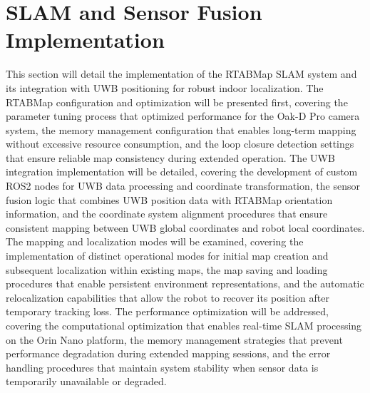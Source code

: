 \section{SLAM and Sensor Fusion Implementation}
This section will detail the implementation of the RTABMap SLAM system and its integration with UWB positioning for robust indoor localization. The RTABMap configuration and optimization will be presented first, covering the parameter tuning process that optimized performance for the Oak-D Pro camera system, the memory management configuration that enables long-term mapping without excessive resource consumption, and the loop closure detection settings that ensure reliable map consistency during extended operation. The UWB integration implementation will be detailed, covering the development of custom ROS2 nodes for UWB data processing and coordinate transformation, the sensor fusion logic that combines UWB position data with RTABMap orientation information, and the coordinate system alignment procedures that ensure consistent mapping between UWB global coordinates and robot local coordinates. The mapping and localization modes will be examined, covering the implementation of distinct operational modes for initial map creation and subsequent localization within existing maps, the map saving and loading procedures that enable persistent environment representations, and the automatic relocalization capabilities that allow the robot to recover its position after temporary tracking loss. The performance optimization will be addressed, covering the computational optimization that enables real-time SLAM processing on the Orin Nano platform, the memory management strategies that prevent performance degradation during extended mapping sessions, and the error handling procedures that maintain system stability when sensor data is temporarily unavailable or degraded.


